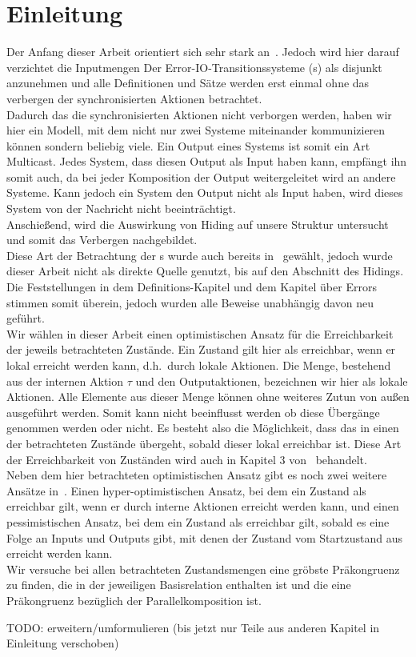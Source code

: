 \chapter{Einleitung}

Der Anfang dieser Arbeit orientiert sich sehr stark an~\cite{Vogler2014EIO}.
Jedoch wird hier darauf verzichtet die Inputmengen Der
Error-IO-Transitionssysteme (\EIO{}s) als disjunkt anzunehmen und alle
Definitionen und Sätze werden erst einmal ohne das verbergen der
synchronisierten Aktionen betrachtet.\\
Dadurch das die synchronisierten Aktionen nicht verborgen werden, haben wir hier
ein Modell, mit dem nicht nur zwei Systeme miteinander kommunizieren können
sondern beliebig viele. Ein Output eines Systems ist somit ein Art Multicast.
Jedes System, dass diesen Output als Input haben kann, empfängt ihn somit auch,
da bei jeder Komposition der Output weitergeleitet wird an andere Systeme.
Kann jedoch ein System den Output nicht als Input haben, wird dieses System von
der Nachricht nicht beeinträchtigt.\\
Anschießend, wird die Auswirkung von Hiding auf unsere Struktur
untersucht und somit das Verbergen nachgebildet.\\
Diese Art der Betrachtung der
\EIO{}s wurde auch bereits in~\cite{Schlosser2012BA} gewählt, jedoch wurde
dieser Arbeit nicht als direkte Quelle genutzt, bis auf den Abschnitt des
Hidings. Die Feststellungen in dem Definitions-Kapitel und dem Kapitel über
Errors stimmen somit überein, jedoch wurden alle Beweise unabhängig davon neu
geführt.\\
Wir wählen in dieser Arbeit einen optimistischen Ansatz für die Erreichbarkeit
der jeweils betrachteten Zustände. Ein Zustand gilt hier als erreichbar, wenn
er lokal erreicht werden kann, d.h.\ durch lokale Aktionen. Die Menge,
bestehend aus der internen Aktion $\tau$ und den Outputaktionen, bezeichnen wir
hier als lokale Aktionen. Alle Elemente aus dieser Menge können ohne weiteres
Zutun von außen ausgeführt werden. Somit kann nicht beeinflusst werden ob diese
Übergänge genommen werden oder nicht. Es besteht also die Möglichkeit, dass das
\EIO{} in einen der betrachteten Zustände übergeht, sobald dieser lokal
erreichbar ist. Diese Art der Erreichbarkeit von Zuständen wird auch in Kapitel
3 von~\cite{Vogler2014EIO} behandelt.\\
Neben dem hier betrachteten optimistischen Ansatz gibt es noch zwei weitere
Ansätze in~\cite{Vogler2014EIO}. Einen hyper-optimistischen Ansatz, bei dem ein
Zustand als erreichbar gilt, wenn er durch interne Aktionen erreicht werden
kann, und einen pessimistischen Ansatz, bei dem ein Zustand als erreichbar gilt,
sobald es eine Folge an Inputs und Outputs gibt, mit denen der Zustand vom
Startzustand aus erreicht werden kann.\\
Wir versuche bei allen betrachteten Zustandsmengen eine gröbste Präkongruenz zu
finden, die in der jeweiligen Basisrelation enthalten ist und die eine
Präkongruenz bezüglich der Parallelkomposition ist.

\scriptsize\textcolor{lgray}{TODO: erweitern/umformulieren (bis jetzt nur Teile
aus anderen Kapitel in Einleitung verschoben)}

\normalsize
